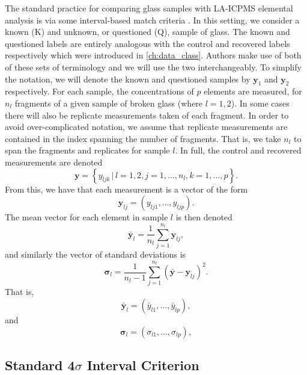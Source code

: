 \documentclass[a4paper]{article}
\newcommand{\bs}[1]{\boldsymbol{#1}}
\newcommand{\y}{\boldsymbol{y}}
\begin{document}
The standard practice for comparing glass samples with LA-ICPMS elemental analysis is via some interval-based match criteria \citep{Park2019}. In this setting, we consider a known (K) and unknown, or questioned (Q), sample of glass. The known and questioned labels are entirely analogous with the control and recovered labels respectively which were introduced in \cref{ch:data_class}. Authors make use of both of these sets of terminology and we will use the two interchangeably. To simplify the notation, we will denote the known and questioned samples by $\bs{y}_1$ and $\bs{y}_2$ respectively. For each sample, the concentrations of $p$ elements are measured, for $n_l$ fragments of a given sample of broken glass (where $l=1,2$). In some cases there will also be replicate measurements taken of each fragment. In order to avoid over-complicated notation, we assume that replicate measurements are contained in the index spanning the number of fragments. That is, we take $n_l$ to span the fragments and replicates for sample $l$. In full, the control and recovered measurements are denoted 
$$
\bs{y} = \left\{y_{ljk} \, | \, l = 1,2, j = 1,\dots,n_l, k = 1,\dots,p \right\}.
$$
From this, we have that each measurement is a vector of the form
\begin{equation*}
	\bs{y}_{lj} = (y_{lj1}, \dots, y_{ljp}).
\end{equation*}
The mean vector for each element in sample $l$ is then denoted
\begin{equation*}
    \bar{\bs{y}}_l = \frac{1}{n_l} \sum_{j=1}^{n_l} \bs{y}_{lj},
\end{equation*}
and similarly the vector of standard deviations is
\begin{equation*}
    \bs{\sigma}_l = \frac{1}{n_l-1} \sum_{j=1}^{n_l} (\bar{\y} - \bs{y}_{lj})^2.
\end{equation*}
That is,
\begin{equation*}
	\bar{\bs{y}}_l = (\bar{y}_{l1}, \dots, \bar{y}_{lp}),
\end{equation*}
and
\begin{equation*}
	\bs{\sigma}_l = (\sigma_{l1}, \dots, \sigma_{lp}),
\end{equation*}

\subsection{Standard 4$\sigma$ Interval Criterion}
\end{document}
